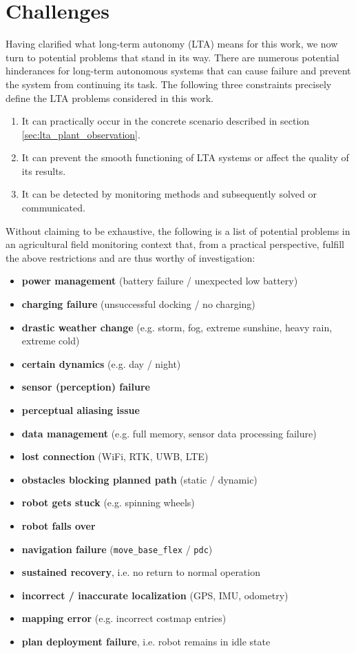 \documentclass[english, master, utf8]{base/thesis_KBS}
\newcommand{\code}[1]{\colorbox{light-gray}{\texttt{#1}}}
\begin{document}
\pagebreak

\section{Challenges}
\label{sec:challenges_for_lta}

Having clarified what long-term autonomy (LTA) means for this work, we now turn to potential problems that stand in its way.
There are numerous potential hinderances for long-term autonomous systems that can cause failure and prevent the system from continuing its task.
The following three constraints precisely define the LTA problems considered in this work.
\begin{enumerate}
    \item It can practically occur in the concrete scenario described in section \ref{sec:lta_plant_observation}.
    \item It can prevent the smooth functioning of LTA systems or affect the quality of its results.
    \item It can be detected by monitoring methods and subsequently solved or communicated.
\end{enumerate}
Without claiming to be exhaustive, the following is a list of potential problems in an agricultural field monitoring context that, 
from a practical perspective, fulfill the above restrictions and are thus worthy of investigation:
\begin{itemize}
    \item \textbf{power management} (battery failure / unexpected low battery)
    \item \textbf{charging failure} (unsuccessful docking / no charging)
    \item \textbf{drastic weather change} (e.g. storm, fog, extreme sunshine, heavy rain, extreme cold)
    \item \textbf{certain dynamics} (e.g. day / night)
    \item \textbf{sensor (perception) failure}
    \item \textbf{perceptual aliasing issue}
    \item \textbf{data management} (e.g. full memory, sensor data processing failure)
    \item \textbf{lost connection} (WiFi, RTK, UWB, LTE)
    \item \textbf{obstacles blocking planned path} (static / dynamic)
    \item \textbf{robot gets stuck} (e.g. spinning wheels)
    \item \textbf{robot falls over}
    \item \textbf{navigation failure} (\code{move\_base\_flex} / \code{pdc})
    \item \textbf{sustained recovery}, i.e. no return to normal operation
    \item \textbf{incorrect / inaccurate localization} (GPS, IMU, odometry)
    \item \textbf{mapping error} (e.g. incorrect costmap entries)
    \item \textbf{plan deployment failure}, i.e. robot remains in idle state
\end{itemize}
\end{document}
